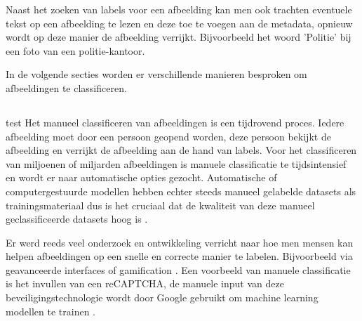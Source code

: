 Naast het zoeken van labels voor een afbeelding kan men ook trachten eventuele tekst op een afbeelding te lezen en deze toe te voegen aan de metadata, opnieuw wordt op deze manier de afbeelding verrijkt. Bijvoorbeeld het woord 'Politie' bij een foto van een politie-kantoor.

In de volgende secties worden er verschillende manieren besproken om afbeeldingen te classificeren.


\subsection{}
\label{sec:manuele-classificatie}
test
Het manueel classificeren van afbeeldingen is een tijdrovend proces. Iedere afbeelding moet door een persoon geopend worden, deze persoon bekijkt de afbeelding en verrijkt de afbeelding aan de hand van labels. Voor het classificeren van miljoenen of miljarden afbeeldingen is manuele classificatie te tijdsintensief en wordt er naar automatische opties gezocht. Automatische of computergestuurde modellen hebben echter steeds manueel gelabelde datasets als trainingsmateriaal dus is het cruciaal dat de kwaliteit van deze manueel geclassificeerde datasets hoog is \autocite{JuliaMoehrmann2012}.

Er werd reeds veel onderzoek en ontwikkeling verricht naar hoe men mensen kan helpen afbeeldingen op een snelle en correcte manier te labelen. Bijvoorbeeld via geavanceerde interfaces \autocite{JuliaMoehrmann2012} of gamification \autocite{LuisvonAhn2004}. Een voorbeeld van manuele classificatie is het invullen van een reCAPTCHA, de manuele input van deze beveiligingstechnologie wordt door Google gebruikt om machine learning modellen te trainen \autocite{Google2021}.

